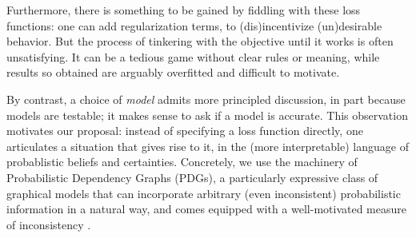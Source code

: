 \documentclass[twoside]{article}
\theoremstyle{plain}
\theoremstyle{definition}
\begin{document}
Furthermore, there is something to be gained by fiddling with these
loss functions: one can add regularization terms, to (dis)incentivize
(un)desirable behavior.
But the process of tinkering with the objective until it works is often unsatisfying.
It can be a tedious game without clear rules or meaning,
 while results so obtained are arguably overfitted and difficult to motivate.
%



By contrast, a choice of \emph{model} admits more principled
discussion, in part because
models are testable; it makes sense to ask if a model is accurate.
This observation motivates our proposal: instead of specifying a loss function directly,
one articulates a situation that gives rise to it, in the (more
interpretable) language of probablistic beliefs and certainties. %
Concretely, we use the machinery of Probabilistic Dependency Graphs (PDGs),
a particularly expressive class of graphical models that can incorporate arbitrary (even inconsistent) probabilistic information in a natural way, and comes equipped with
a well-motivated measure of inconsistency  \parencite{richardson2020probabilistic}.
\end{document}
